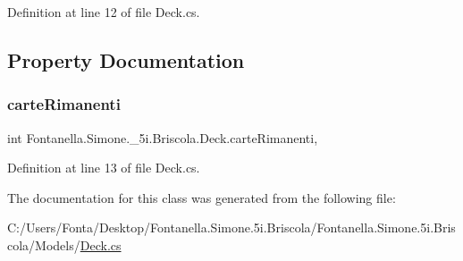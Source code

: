 Definition at line 12 of file Deck.\+cs.



\subsection{Property Documentation}
\hypertarget{class_fontanella_1_1_simone_1_1__5i_1_1_briscola_1_1_deck_aa18c1840ad50ac7c015b5bcc34c1892f}{}\label{class_fontanella_1_1_simone_1_1__5i_1_1_briscola_1_1_deck_aa18c1840ad50ac7c015b5bcc34c1892f} 
\subsubsection{\texorpdfstring{carte\+Rimanenti}{carteRimanenti}}
{\footnotesize\ttfamily int Fontanella.\+Simone.\+\_\+5i.\+Briscola.\+Deck.\+carte\+Rimanenti\hspace{0.3cm}{\ttfamily [get]}, {\ttfamily [set]}}



Definition at line 13 of file Deck.\+cs.



The documentation for this class was generated from the following file\+:\begin{DoxyCompactItemize}
\item 
C\+:/\+Users/\+Fonta/\+Desktop/\+Fontanella.\+Simone.\+5i.\+Briscola/\+Fontanella.\+Simone.\+5i.\+Briscola/\+Models/\hyperlink{_deck_8cs}{Deck.\+cs}\end{DoxyCompactItemize}
